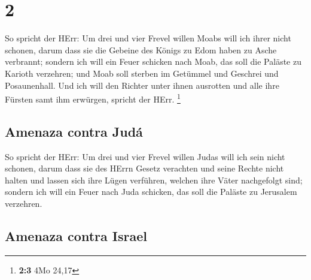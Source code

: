 \hypertarget{section-1}{%
\section{2}\label{section-1}}

 So spricht der HErr: Um drei und vier Frevel willen Moabs
will ich ihrer nicht schonen, darum dass sie die Gebeine des Königs zu
Edom haben zu Asche verbrannt;  sondern ich will ein Feuer
schicken nach Moab, das soll die Paläste zu Karioth verzehren; und Moab
soll sterben im Getümmel und Geschrei und Posaunenhall. 
Und ich will den Richter unter ihnen ausrotten und alle ihre Fürsten
samt ihm erwürgen, spricht der HErr. \footnote{\textbf{2:3} 4Mo 24,17}

\hypertarget{amenaza-contra-juduxe1}{%
\subsection{Amenaza contra Judá}\label{amenaza-contra-juduxe1}}

 So spricht der HErr: Um drei und vier Frevel willen Judas
will ich sein nicht schonen, darum dass sie des HErrn Gesetz verachten
und seine Rechte nicht halten und lassen sich ihre Lügen verführen,
welchen ihre Väter nachgefolgt sind;  sondern ich will ein
Feuer nach Juda schicken, das soll die Paläste zu Jerusalem verzehren.

\hypertarget{amenaza-contra-israel}{%
\subsection{Amenaza contra Israel}\label{amenaza-contra-israel}}

